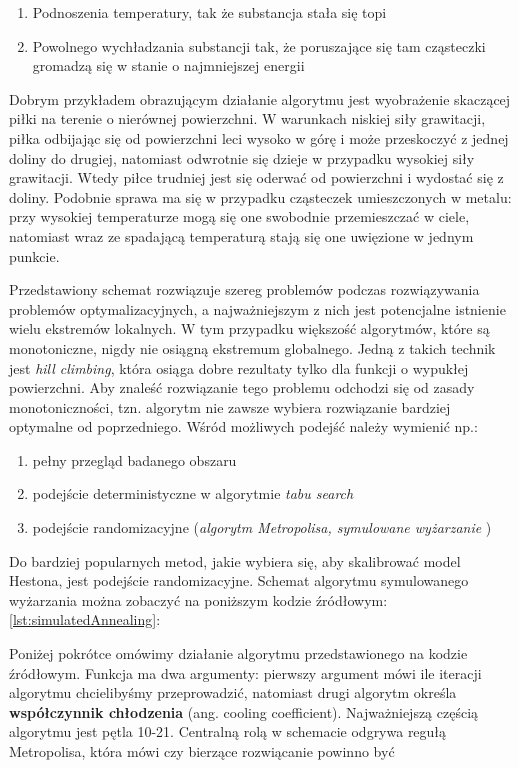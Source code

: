 \documentclass{pracamgr}
\begin{document}
\begin{enumerate}
  \item Podnoszenia temperatury, tak że substancja stała się topi
  \item Powolnego wychładzania substancji tak, że poruszające się tam cząsteczki gromadzą się w stanie o najmniejszej energii
\end{enumerate}

Dobrym przykładem obrazującym działanie algorytmu jest wyobrażenie skaczącej piłki na terenie 
o nierównej powierzchni.
W warunkach niskiej siły grawitacji, piłka odbijając się od powierzchni leci wysoko w górę i może przeskoczyć z jednej doliny do drugiej, natomiast odwrotnie się dzieje w przypadku wysokiej siły grawitacji. Wtedy piłce trudniej jest się oderwać od powierzchni i wydostać się z doliny. Podobnie sprawa ma się w przypadku cząsteczek umieszczonych w metalu: przy wysokiej 
temperaturze mogą się one swobodnie przemieszczać w ciele, natomiast wraz ze spadającą temperaturą 
stają się one uwięzione w jednym punkcie.

Przedstawiony schemat rozwiązuje szereg problemów podczas rozwiązywania problemów optymalizacyjnych, a najważniejszym z nich jest potencjalne istnienie wielu ekstremów lokalnych.
W tym przypadku większość algorytmów, które są monotoniczne, nigdy nie osiągną ekstremum globalnego. Jedną z takich technik jest \textit{hill climbing}, która osiąga dobre rezultaty tylko dla funkcji o wypukłej powierzchni. Aby znaleść rozwiązanie tego problemu odchodzi się od zasady monotoniczności, tzn. algorytm nie zawsze wybiera rozwiązanie bardziej optymalne od poprzedniego. 
Wśród możliwych podejść należy wymienić np.:
\begin{enumerate}
  \item pełny przegląd badanego obszaru
  \item podejście deterministyczne w algorytmie \textit{tabu search}
  \item podejście randomizacyjne (\textit{algorytm Metropolisa, symulowane wyżarzanie} \cite{OptimalizationBySimulatedAnnealing} )
\end{enumerate}


Do bardziej popularnych metod, jakie wybiera się, aby skalibrować model Hestona, jest podejście randomizacyjne. Schemat algorytmu symulowanego wyżarzania można zobaczyć na poniższym kodzie źródłowym:
\ref{lst:simulatedAnnealing}:

Poniżej pokrótce omówimy działanie algorytmu przedstawionego na kodzie źródłowym.
Funkcja ma dwa argumenty: pierwszy argument mówi ile iteracji algorytmu chcielibyśmy przeprowadzić, natomiast
drugi algorytm określa \textbf{współczynnik chłodzenia} (ang. cooling coefficient).
Najważniejszą częścią algorytmu jest pętla 10-21. 
Centralną rolą w schemacie odgrywa regułą Metropolisa, która mówi czy bierzące rozwiącanie powinno być 
\end{document}
